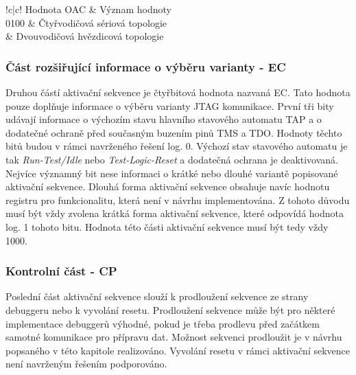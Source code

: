 \begin{table}[!h]
  \caption{Tabulka významu OAC hodnot.}
  \begin{center}
  	\small
	  \begin{tabular}{!{\vrule width 1.2pt}c|c!{\vrule width 1.2pt}}
	    Hodnota \acs{OAC} & Význam hodnoty\\
			0100 & Čtyřvodičová sériová topologie\\
			 & Dvouvodičová hvězdicová topologie\\
			\hline
		\end{tabular}
  \end{center}
	\label{tab:oac}
\end{table}

\subsubsection{Část rozšiřující informace o výběru varianty - \acs{EC}}
Druhou částí aktivační sekvence je čtyřbitová hodnota nazvaná \acl{EC}. Tato hodnota pouze doplňuje informace o výběru varianty \acs{JTAG} komunikace. První tři bity udávají informace o výchozím stavu hlavního stavového automatu \acs{TAP} a o dodatečné ochraně před současným buzením pinů \acs{TMS} a \acs{TDO}. Hodnoty těchto bitů budou v rámci navrženého řešení log. 0. Výchozí stav stavového automatu je tak \textit{Run-Test/Idle} nebo \textit{Test-Logic-Reset} a dodatečná ochrana je deaktivovaná. Nejvíce významný bit nese informaci o krátké nebo dlouhé variantě popisované aktivační sekvence. Dlouhá forma aktivační sekvence obsahuje navíc hodnotu registru pro funkcionalitu, která není v návrhu implementována. Z tohoto důvodu musí být vždy zvolena krátká forma aktivační sekvence, které odpovídá hodnota log. 1 tohoto bitu. Hodnota této části aktivační sekvence musí být tedy vždy 1000. \cite{IEEE_1149-7}

\subsubsection{Kontrolní část - \acs{CP}}
Poslední část aktivační sekvence slouží k prodloužení sekvence ze strany debuggeru nebo k vyvolání resetu. Prodloužení sekvence může být pro některé implementace debuggerů výhodné, pokud je třeba prodlevu před začátkem samotné komunikace pro přípravu dat. Možnost sekvenci prodloužit je v návrhu popsaného v této kapitole realizováno. Vyvolání resetu v rámci aktivační sekvence není navrženým řešením podporováno. 

